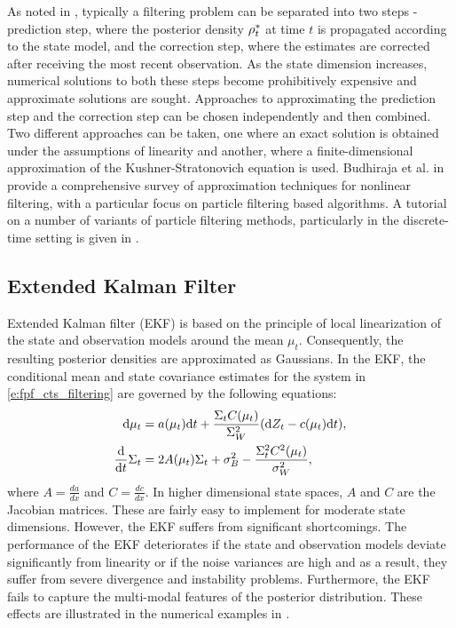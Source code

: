 As noted in , typically a filtering problem can be separated into two steps - prediction step, where the posterior density $\rho^*_t$ at time $t$ is propagated according to the state model, and the correction step, where the estimates are corrected after receiving the most recent observation. As the state dimension increases, numerical solutions to both these steps become prohibitively expensive and approximate solutions are sought. Approaches to approximating the prediction step and the correction step can be chosen independently and then combined. Two different approaches can be taken, one where an exact solution is obtained under the assumptions of linearity and another, where a finite-dimensional approximation of the Kushner-Stratonovich equation is used. Budhiraja et al. in \cite{budchelee07} provide a comprehensive survey of approximation techniques for nonlinear filtering, with a particular focus on particle filtering based algorithms. A tutorial on a number of variants of particle filtering methods, particularly in the discrete-time setting is given in \cite{arumasgorcla02}.
\subsection{Extended Kalman Filter}
\label{s:ekf}
Extended Kalman filter (EKF) \cite{jaz70} is based on the principle of local linearization of the state and observation models around the mean $\mu_t$. Consequently, the resulting posterior densities are approximated as Gaussians. In the EKF, the conditional mean and state covariance estimates for the system in \eqref{e:fpf_cts_filtering} are governed by the following equations: 
\begin{align}
\ud \mu_t &= a(\mu_t) \ud t + \frac{\Sigma_t C(\mu_t)}{\Sigma^2_W} (\ud Z_t - c(\mu_t) \ud t), \\
\frac{\ud}{\ud t} \Sigma_t &= 2 A(\mu_t) \Sigma_t  + \sigma^2_B - \frac{\Sigma^2_t C^2(\mu_t)}{\sigma^2_W}, 
\label{e:fpf_ekf}
\end{align}
where $A = \frac{d a}{dx}$ and $C = \frac{d c}{dx}$. In higher dimensional state spaces, $A$ and $C$ are the Jacobian matrices. These are fairly easy to implement for moderate state dimensions. However, the EKF suffers from significant shortcomings. The performance of the EKF deteriorates if the state and observation models deviate significantly from linearity or if the noise variances are high and as a result, they suffer from severe divergence and instability problems. Furthermore, the EKF fails to capture the multi-modal features of the posterior distribution. These effects are illustrated in the numerical examples in .

